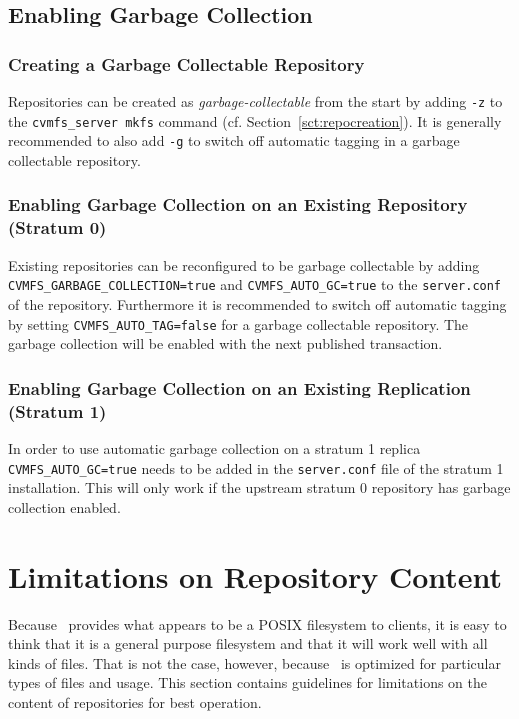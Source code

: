 \subsection{Enabling Garbage Collection}
\label{sct:enablegc}

\subsubsection{Creating a Garbage Collectable Repository}
Repositories can be created as \emph{garbage-collectable} from the start by adding \texttt{-z} to the \texttt{cvmfs\_server mkfs} command (cf. Section~\ref{sct:repocreation}).
It is generally recommended to also add \texttt{-g} to switch off automatic tagging in a garbage collectable repository.

\subsubsection{Enabling Garbage Collection on an Existing Repository (Stratum 0)}
Existing repositories can be reconfigured to be garbage collectable by adding\\ \texttt{CVMFS\_GARBAGE\_COLLECTION=true} and \texttt{CVMFS\_AUTO\_GC=true} to the \texttt{server.conf} of the repository.
Furthermore it is recommended to switch off automatic tagging by setting \texttt{CVMFS\_AUTO\_TAG=false} for a garbage collectable repository.
The garbage collection will be enabled with the next published transaction.

\subsubsection{Enabling Garbage Collection on an Existing Replication (Stratum 1)}
In order to use automatic garbage collection on a stratum 1 replica \texttt{CVMFS\_AUTO\_GC=true} needs to be added in the \texttt{server.conf} file of the stratum 1 installation.
This will only work if the upstream stratum 0 repository has garbage collection enabled.

\section{Limitations on Repository Content}
Because \cvmfs\ provides what appears to be a POSIX filesystem to clients, it is easy to think that it is a general purpose filesystem and that it will work well with all kinds of files.
That is not the case, however, because \cvmfs\ is optimized for particular types of files and usage.
This section contains guidelines for limitations on the content of repositories for best operation.

